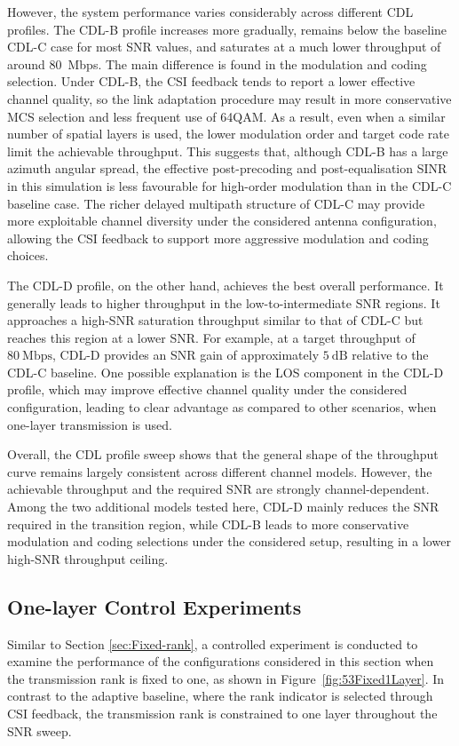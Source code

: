 \documentclass[a4paper,12pt,onecolumn]{article}
\begin{document}
			However, the system performance varies considerably across different CDL profiles. The CDL-B profile increases more gradually, remains below the baseline CDL-C case for most SNR values, and saturates at a much lower throughput of around 80~Mbps. The main difference is found in the modulation and coding selection. Under CDL-B, the CSI feedback tends to report a lower effective channel quality, so the link adaptation procedure may result in more conservative MCS selection and less frequent use of 64QAM. As a result, even when a similar number of spatial layers is used, the lower modulation order and target code rate limit the achievable throughput. This suggests that, although CDL-B has a large azimuth angular spread, the effective post-precoding and post-equalisation SINR in this simulation is less favourable for high-order modulation than in the CDL-C baseline case. The richer delayed multipath structure of CDL-C may provide more exploitable channel diversity under the considered antenna configuration, allowing the CSI feedback to support more aggressive modulation and coding choices.
			
			
			The CDL-D profile, on the other hand, achieves the best overall performance. It generally leads to higher throughput in the low-to-intermediate SNR regions. It approaches a high-SNR saturation throughput similar to that of CDL-C but reaches this region at a lower SNR. For example, at a target throughput of \(80~\mathrm{Mbps}\), CDL-D provides an SNR gain of approximately \(5~\mathrm{dB}\) relative to the CDL-C baseline. One possible explanation is the LOS component in the CDL-D profile, which may improve effective channel quality under the considered configuration, leading to clear advantage as compared to other scenarios, when one-layer transmission is used.
			
			Overall, the CDL profile sweep shows that the general shape of the throughput curve remains largely consistent across different channel models. However, the achievable throughput and the required SNR are strongly channel-dependent. Among the two additional models tested here, CDL-D mainly reduces the SNR required in the transition region, while CDL-B leads to more conservative modulation and coding selections under the considered setup, resulting in a lower high-SNR throughput ceiling.

		\subsection{One-layer Control Experiments}
		\label{sec:4.3}
			Similar to Section \ref{sec:Fixed-rank}, a controlled experiment is conducted to examine the performance of the configurations considered in
			this section when the transmission rank is fixed to one, as shown in Figure~\ref{fig:53Fixed1Layer}. In contrast to the adaptive baseline, where the rank indicator is selected through CSI feedback, the transmission rank is constrained to one layer throughout the SNR sweep. 
		
\end{document}
